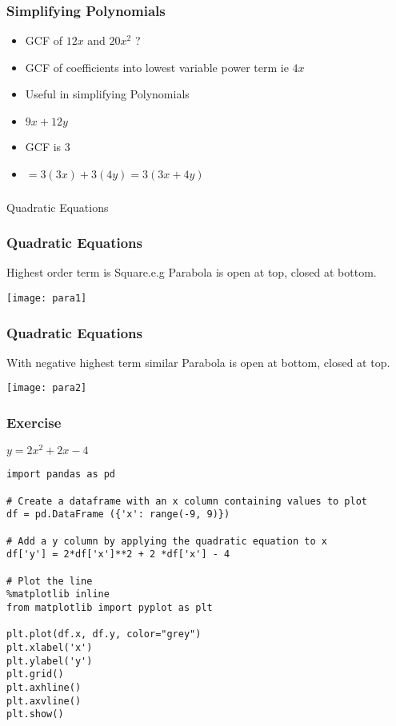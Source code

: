  \begin{frame}[fragile]\frametitle{Simplifying Polynomials}
\begin{itemize}
\item GCF of $12x$ and $20x^2$ ?
\item GCF of coefficients into lowest variable power term ie $4x$
\item Useful in simplifying Polynomials
\item $9x + 12y$
\item GCF is 3
\item $= 3(3x) + 3(4y) = 3(3x+4y)$
\end{itemize}
\end{frame}

\begin{frame}[fragile]\frametitle{}
\begin{center}
{\Large Quadratic Equations}
\end{center}
\end{frame}

 \begin{frame}[fragile]\frametitle{Quadratic Equations}
 Highest order term is Square.e.g Parabola is open at top, closed at bottom.
\begin{center}
\texttt{[image: para1]}
\end{center}

\end{frame}


 \begin{frame}[fragile]\frametitle{Quadratic Equations}
With negative highest term similar Parabola is open at bottom, closed at top.
\begin{center}
\texttt{[image: para2]}
\end{center}

\end{frame}

 \begin{frame}[fragile]\frametitle{Exercise}
$y = 2x^2 + 2x - 4$

\begin{lstlisting}
import pandas as pd

# Create a dataframe with an x column containing values to plot
df = pd.DataFrame ({'x': range(-9, 9)})

# Add a y column by applying the quadratic equation to x
df['y'] = 2*df['x']**2 + 2 *df['x'] - 4

# Plot the line
%matplotlib inline
from matplotlib import pyplot as plt

plt.plot(df.x, df.y, color="grey")
plt.xlabel('x')
plt.ylabel('y')
plt.grid()
plt.axhline()
plt.axvline()
plt.show()
\end{lstlisting}
\end{frame}

